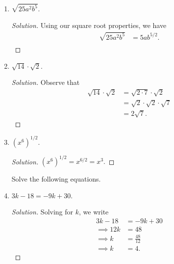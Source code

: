 \documentclass{article}
\begin{document}
\begin{enumerate}
    \begin{proof}[Solution]
    We can express \(75\) and \(28\) in terms of their prime factorizations. Hence, \( 75 = 5^2 \cdot 3 \) and \( 48 = 4^2 \cdot 3\). Therefore, we can write 
    \begin{align*}
        \sqrt{75} + \sqrt{48} &= \sqrt{5^2 \cdot 3 } + \sqrt{4^2 \cdot 3 } \\
                              &= (5 + 4)\sqrt{3} \\
                              &= 9 \sqrt{3}.
    \end{align*}
    Hence, 
    \[ \sqrt{75} + \sqrt{48} = 9 \sqrt{3}. \]
    \end{proof}
\item \( \sqrt{25a^2b^5}.\)

    \begin{proof}[Solution]
    Using our square root properties, we have 
    \begin{align*}
        \sqrt{25 a^2 b^5 }&= 5ab^{5/2}. \\
    \end{align*}
\end{proof}
\item \( \sqrt{14} \cdot \sqrt{2}.\)
\begin{proof}[Solution]
    Observe that 
    \begin{align*}
        \sqrt{14} \cdot \sqrt{2} &= \sqrt{2 \cdot 7} \cdot \sqrt{2} \\
    &= \sqrt{2} \cdot \sqrt{2} \cdot \sqrt{7} \\
    &= 2 \sqrt{7}.
    \end{align*}
\end{proof}

\item \( (x^6)^{1/2}\).
\begin{proof}[Solution]
    \( (x^6)^{1/2} = x^{6/2} = x^3.\)
\end{proof}

Solve the following equations.

\item \( 3k - 18 = -9k + 30 \).
\begin{proof}[Solution]
    Solving for \( k \), we write 
    \begin{align*}
        3k - 18 &= -9k + 30 \\
        \implies 12k &= 48 \\
        \implies k &= \frac{48}{12} \\ 
        \implies k &= 4.
    \end{align*}
\end{proof}


\end{enumerate}
\end{document}
